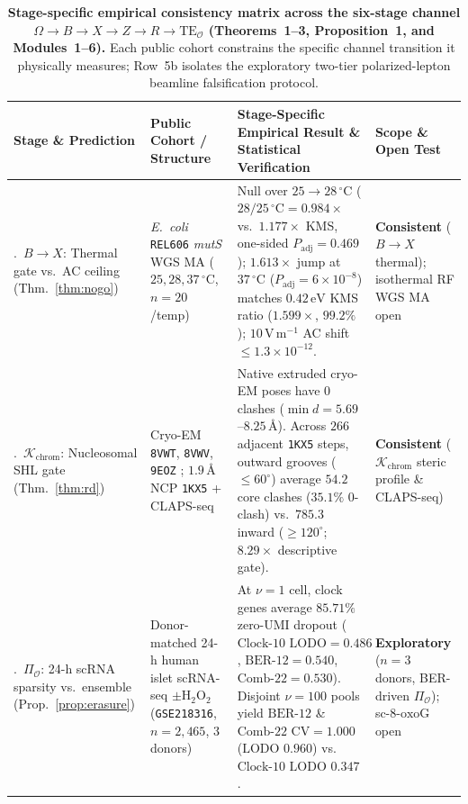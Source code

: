 \documentclass[10pt,letterpaper]{article}
\theoremstyle{plain}
\theoremstyle{definition}
\newcommand{\oxog}{\text{8-oxoG}}
\begin{document}
\begin{table}[!t]
\centering
\caption{\textbf{Stage-specific empirical consistency matrix across the six-stage channel $\Omega \to B \to X \to Z \to R \to \mathrm{TE}_{\mathcal{O}}$ (Theorems~1--3, Proposition~1, and Modules~1--6).} Each public cohort constrains the specific channel transition it physically measures; Row~5b isolates the exploratory two-tier polarized-lepton beamline falsification protocol.}
\label{tab:exp}
\scriptsize
\begin{tabularx}{\textwidth}{@{}>{\raggedright\arraybackslash}p{2.35cm}>{\raggedright\arraybackslash}p{2.65cm}>{\raggedright\arraybackslash}X>{\raggedright\arraybackslash}p{2.55cm}@{}}
\toprule
\textbf{Stage \& Prediction} & \textbf{Public Cohort / Structure} & \textbf{Stage-Specific Empirical Result \& Statistical Verification} & \textbf{Scope \& Open Test} \\
\midrule
1.\ $B \to X$: Thermal gate vs.\ AC ceiling (Thm.~\ref{thm:nogo}) & \emph{E.\ coli} \texttt{REL606} \emph{mutS} WGS MA ($25,28,37\,^\circ\mathrm{C}$, $n=20$/temp) \cite{chu2018bmcevol} & Null over $25\to 28\,^\circ\mathrm{C}$ ($28/25\,^\circ\mathrm{C}=0.984\times$ vs.\ $1.177\times$ KMS, one-sided $P_{\mathrm{adj}}=0.469$); $1.613\times$ jump at $37\,^\circ\mathrm{C}$ ($P_{\mathrm{adj}}=6\times 10^{-8}$) matches $0.42\,\mathrm{eV}$ KMS ratio ($1.599\times$, $99.2\%$); $10\,\mathrm{V\,m^{-1}}$ AC shift $\le 1.3\times 10^{-12}$. & \textbf{Consistent} ($B\to X$ thermal); isothermal RF WGS MA open \\
\addlinespace[2pt]
2.\ $\mathcal{K}_{\mathrm{chrom}}$: Nucleosomal SHL gate (Thm.~\ref{thm:rd}) & Cryo-EM \texttt{8VWT}, \texttt{8VWV}, \texttt{9EOZ} \cite{ren2024natcommun}; $1.9\,\text{\AA}$ NCP \texttt{1KX5} + CLAPS-seq \cite{li2025nar} & Native extruded cryo-EM poses have $0$ clashes ($\min d = 5.69$--$8.25\,\text{\AA}$). Across $266$ adjacent \texttt{1KX5} steps, outward grooves ($\le 60^\circ$) average $54.2$ core clashes ($35.1\%$ $0$-clash) vs.\ $785.3$ inward ($\ge 120^\circ$; $8.29\times$ descriptive gate). & \textbf{Consistent} ($\mathcal{K}_{\mathrm{chrom}}$ steric profile \& CLAPS-seq) \\
\addlinespace[2pt]
3.\ $\Pi_{\mathcal{O}}$: 24-h scRNA sparsity vs.\ ensemble (Prop.~\ref{prop:erasure}) & Donor-matched 24-h human islet scRNA-seq $\pm\mathrm{H_2O_2}$ (\texttt{GSE218316}, $n=2{,}465$, $3$ donors) \cite{thomaidou2023diabetologia} & At $\nu=1$ cell, clock genes average $85.71\%$ zero-UMI dropout ($\text{Clock-10 LODO}=0.486$, $\text{BER-12}=0.540$, $\text{Comb-22}=0.530$). Disjoint $\nu=100$ pools yield $\text{BER-12}$ \& $\text{Comb-22 CV}=1.000$ ($\text{LODO } 0.960$) vs.\ $\text{Clock-10 LODO } 0.347$. & \textbf{Exploratory} ($n=3$ donors, BER-driven $\Pi_{\mathcal{O}}$); sc-$\oxog$ open \\

\end{tabularx}
\end{table}
\end{document}
